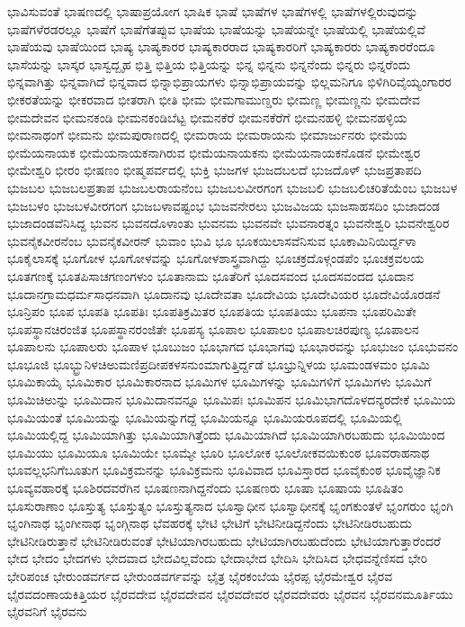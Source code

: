 {ಭಾವಿಸುವಂತೆ
ಭಾಷಣದಲ್ಲಿ
ಭಾಷಾಪ್ರಯೋಗ
ಭಾಷಿಕ
ಭಾಷೆ
ಭಾಷೆಗಳ
ಭಾಷೆಗಳಲ್ಲಿ
ಭಾಷೆಗಳಲ್ಲಿರುವುದನ್ನು
ಭಾಷೆಗಳೆರಡರಲ್ಲೂ
ಭಾಷೆಗೆ
ಭಾಷೆಗೆತಪ್ಪುವ
ಭಾಷೆಯ
ಭಾಷೆಯನ್ನು
ಭಾಷೆಯನ್ನೇ
ಭಾಷೆಯಲ್ಲಿ
ಭಾಷೆಯಲ್ಲಿವೆ
ಭಾಷೆಯವು
ಭಾಷೆಯಿಂದ
ಭಾಷ್ಯ
ಭಾಷ್ಯಕಾರರ
ಭಾಷ್ಯಕಾರರಾದ
ಭಾಷ್ಯಕಾರರಿಗೆ
ಭಾಷ್ಯಕಾರರು
ಭಾಷ್ಯಕಾರರೆಂದೂ
ಭಾಸೆಯನ್ನು
ಭಾಸ್ಕರ
ಭಾಸ್ವದ್ಬೃಹ
ಭಿತ್ತಿ
ಭಿತ್ತಿಯ
ಭಿತ್ತಿಯನ್ನು
ಭಿನ್ನ
ಭಿನ್ನನು
ಭಿನ್ನನೆಂದು
ಭಿನ್ನರು
ಭಿನ್ನರೆಂದು
ಭಿನ್ನವಾಗಿತ್ತು
ಭಿನ್ನವಾಗಿದೆ
ಭಿನ್ನವಾದ
ಭಿನ್ನಾಭಿಪ್ರಾಯಗಳು
ಭಿನ್ನಾಭಿಪ್ರಾಯವನ್ನು
ಭಿಲ್ಲಮನಿಗೂ
ಭಿಳಿಗಿರಿವೈಯ್ಯಂಗಾರರ
ಭೀಕರತೆಯನ್ನು
ಭೀಕರವಾದ
ಭೀತರಾಗಿ
ಭೀತಿ
ಭೀಮ
ಭೀಮಗಾಮುಣ್ಡರು
ಭೀಮಣ್ಣ
ಭೀಮಣ್ಣನು
ಭೀಮದೇವ
ಭೀಮದೇವನ
ಭೀಮನಕಂಡಿ
ಭೀಮನಕಂಡಿಬೆಟ್ಟ
ಭೀಮನಕೆರೆ
ಭೀಮನಕೆರೆಗೆ
ಭೀಮನಹಳ್ಳಿ
ಭೀಮನಹಳ್ಳಿಯ
ಭೀಮನಾಥಂಗೆ
ಭೀಮನು
ಭೀಮಪುರಾಣದಲ್ಲಿ
ಭೀಮರಾಯ
ಭೀಮರಾಯನು
ಭೀಮಾರ್ಜುನರು
ಭೀಮೆಯ
ಭೀಮೆಯನಾಯಕ
ಭೀಮೆಯನಾಯಕನಾಗಿರುವ
ಭೀಮೆಯನಾಯಕನು
ಭೀಮೆಯನಾಯಕನೊಡನೆ
ಭೀಮೇಶ್ವರ
ಭೀಮೇಶ್ವರಿ
ಭೀರಂ
ಭೀಷಣಂ
ಭೀಷ್ಮಪರ್ವದಲ್ಲಿ
ಭುಕ್ತಿ
ಭುಜಗಳ
ಭುಜದಬಲದೆ
ಭುಜದೊಳ್
ಭುಜಪ್ರತಾಪದಿ
ಭುಜಬಲ
ಭುಜಬಲಪ್ರತಾಪ
ಭುಜಬಲರಾಯನೆಂಬ
ಭುಜಬಲವೀರಗಂಗ
ಭುಜಬಲಿ
ಭುಜಬಲಿಚರಿತೆಯೆಂಬ
ಭುಜಬಳ
ಭುಜಬಳಂ
ಭುಜಬಳವೀರಗಂಗ
ಭುಜಬಳಾವಷ್ಟಂಭ
ಭುಜವನೇರಲು
ಭುಜವಿಜಯ
ಭುಜಸಾಹಸದಿಂ
ಭುಜಾದಂಡ
ಭುಜಾದಂಡವೆನಿಸಿದ್ದ
ಭುವನ
ಭುವನದೊಳಾಂತು
ಭುವನಮ
ಭುವನವೇ
ಭುವನಾರತ್ನಂ
ಭುವನೇಶ್ವರಿ
ಭುವನೇಶ್ವರಿರ
ಭುವನೈಕವೀರನೆಂಬ
ಭುವನೈಕವೀರನ್
ಭುವಾಂ
ಭುವಿ
ಭೂ
ಭೂಕಯಿಲಾಸವೆನಿಸುವ
ಭೂಕಾಮಿನಿಯಿರ್ದ್ದಳಾ
ಭೂಕೈಲಾಸಕ್ಕೆ
ಭೂಗೋಳ
ಭೂಗೋಳವನ್ನು
ಭೂಗೋಳಶಾಸ್ತ್ರವಾಗಿದ್ದು
ಭೂಚಕ್ರದೊಳ್ಗಂಡಪೆಂ
ಭೂಚಕ್ರವಲಯ
ಭೂತಗಣಕ್ಕೆ
ಭೂತಪಿಸಾಚಗಣಂಗಳುಂ
ಭೂತಾನಾಮ
ಭೂತೆರಿಗೆ
ಭೂದಸವಂದ
ಭೂದಸವಂದದ
ಭೂದಾನ
ಭೂದಾನಗ್ರಾಮಧರ್ಮಸಾಧನವಾಗಿ
ಭೂದಾನವು
ಭೂದೇವತಾ
ಭೂದೇವಿಯ
ಭೂದೇವಿಯರ
ಭೂದೇವಿಯೊರಡನೆ
ಭೂನ್ರಿಪಂ
ಭೂಪ
ಭೂಪತಿ
ಭೂಪತಿಃ
ಭೂಪತಿಕ್ರಮಿತರ
ಭೂಪತಿಯ
ಭೂಪತಿಯು
ಭೂಪನಾ
ಭೂಪರಿಮಿತೇ
ಭೂಪಸ್ಥಾನಚಿರಂಜಿತ
ಭೂಪಸ್ಥಾನರಂಜಿತೇ
ಭೂಪಸ್ಯ
ಭೂಪಾಲ
ಭೂಪಾಲಂ
ಭೂಪಾಲಚಿರಪುಣ್ಯ
ಭೂಪಾಲನ
ಭೂಪಾಲನು
ಭೂಪಾಲರು
ಭೂಪಾಳ
ಭೂಬುಜಂ
ಭೂಭಾಗದ
ಭೂಭಾಗವು
ಭೂಭಾರವನ್ನು
ಭೂಭುಜಂ
ಭೂಭುವನಂ
ಭೂಭೂಜಿ
ಭೂಭ್ಭ್ರುನಿಳಚಿಅುಮಣಿಪ್ರದೀಪಕಳಸನುಂಮಾಗುತ್ತಿರ್ದ್ದಡೆ
ಭೂಭ್ರುನ್ನಿಳಯ
ಭೂಮಂಡಳಮಂ
ಭೂಮಿ
ಭೂಮಿಕಾಯೈ
ಭೂಮಿಕಾರ
ಭೂಮಿಕಾರನಾದ
ಭೂಮಿಗಳ
ಭೂಮಿಗಳನ್ನು
ಭೂಮಿಗಳಿಗೆ
ಭೂಮಿಗಳು
ಭೂಮಿಗೆ
ಭೂಮಿಚಿಅುನ್ನು
ಭೂಮಿದಾನ
ಭೂಮಿದಾನವನ್ನೂ
ಭೂಮಿಪಃ
ಭೂಮಿಪನ
ಭೂಮಿಭಾಗದೊಳದನ್ಯರದೇಕೆ
ಭೂಮಿಯ
ಭೂಮಿಯಂತೆ
ಭೂಮಿಯನ್ನು
ಭೂಮಿಯನ್ನುಗದ್ದೆ
ಭೂಮಿಯನ್ನೂ
ಭೂಮಿಯರೂಪದಲ್ಲಿ
ಭೂಮಿಯಲ್ಲಿ
ಭೂಮಿಯಲ್ಲಿದ್ದ
ಭೂಮಿಯಾಗಿತ್ತು
ಭೂಮಿಯಾಗಿತ್ತೆಂದು
ಭೂಮಿಯಾಗಿದೆ
ಭೂಮಿಯಾಗಿರಬಹುದು
ಭೂಮಿಯಿಂದ
ಭೂಮಿಯು
ಭೂಮಿಯೂ
ಭೂಮಿಯೇ
ಭೂಮ್ಯೇ
ಭೂರಿ
ಭೂಲೋಕ
ಭೂಲೋಕವಯಿಕುಂಠ
ಭೂವರಾಹನಾಥ
ಭೂವಲ್ಲಭನಿಗೆಬೂತುಗ
ಭೂವಿಕ್ರಮನನ್ನು
ಭೂವಿಕ್ರಮನು
ಭೂವಿವಾದ
ಭೂವಿಸ್ತಾರದ
ಭೂವೈಕುಂಠ
ಭೂವೈಜ್ಞಾನಿಕ
ಭೂವ್ಯವಹಾರಕ್ಕೆ
ಭೂಶಿರದವರೆಗಿನ
ಭೂಷಣನಾಗಿದ್ದನೆಂದು
ಭೂಷಣರು
ಭೂಷಾ
ಭೂಷಾಯ
ಭೂಷಿತಂ
ಭೂಸುರಾಣಾಂ
ಭೂಸ್ತುತ್ಯ
ಭೂಸ್ತುತ್ಯಂ
ಭೂಸ್ತುತ್ಯನಾದ
ಭೂಸ್ವಾಧೀನ
ಭೂಸ್ವಾಧೀನಕ್ಕೆ
ಭೃಂಗಕುಂತಳೆ
ಭೃಂಗರುಂ
ಭೃಂಗಿ
ಭೃಂಗಿನಾಥ
ಭೃಂಗೀನಾಥ
ಭೃಂಗ್ಗಿನಾಥ
ಭೆವಹರಕ್ಕೆ
ಭೇಟಿ
ಭೇಟಿಗೆ
ಭೇಟಿನೀಡಿದ್ದನೆಂದು
ಭೇಟಿನೀಡಿರಬಹುದು
ಭೇಟಿನೀಡಿರುತ್ತಾನೆ
ಭೇಟಿನೀಡಿರುವಂತೆ
ಭೇಟಿಯಾಗಿರಬಹುದು
ಭೇಟಿಯಾಗಿರಬಹುದೆಂದು
ಭೇಟಿಯಾಗುತ್ತಾರೆಂದರೆ
ಭೇದ
ಭೇದಂ
ಭೇದಗಳು
ಭೇದವಾದ
ಭೇದವಿಲ್ಲವೆಂದು
ಭೇದಾಭೇದ
ಭೇದಿಸಿ
ಭೇದಿಸಿದ
ಭೇಧವನ್ನೆಣಿಸದ
ಭೇರಿ
ಭೇರಿಪಂಚ
ಭೇರುಂಡವರ್ಗದ
ಭೇರುಂಡವರ್ಗವನ್ನು
ಭೈತ್ರ
ಭೈರಕಂಬೆಯ
ಭೈರಪ್ಪ
ಭೈರಮೇಶ್ವರ
ಭೈರವ
ಭೈರವದಂಣಾಯಕಿತ್ತಿಯರ
ಭೈರವದೇವ
ಭೈರವದೇವನ
ಭೈರವದೇವರ
ಭೈರವದೇವರು
ಭೈರವನ
ಭೈರವನಮೂರ್ತಿಯು
ಭೈರವನಿಗೆ
ಭೈರವನು
}
